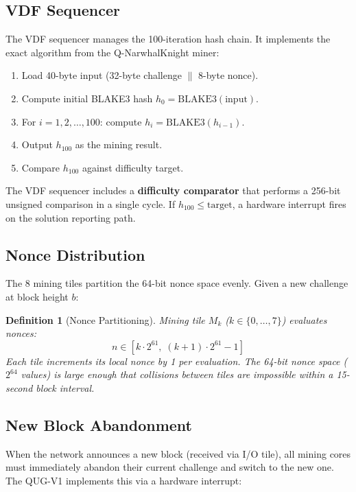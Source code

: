 \documentclass[11pt,a4paper]{article}
\newtheorem{definition}[theorem]{Definition}
\begin{document}
\subsection{VDF Sequencer}

The VDF sequencer manages the 100-iteration hash chain. It implements the exact algorithm from the Q-NarwhalKnight miner:

\begin{enumerate}
    \item Load 40-byte input (32-byte challenge $\|$ 8-byte nonce).
    \item Compute initial BLAKE3 hash $h_0 = \text{BLAKE3}(\text{input})$.
    \item For $i = 1, 2, \ldots, 100$: compute $h_i = \text{BLAKE3}(h_{i-1})$.
    \item Output $h_{100}$ as the mining result.
    \item Compare $h_{100}$ against difficulty target.
\end{enumerate}

The VDF sequencer includes a \textbf{difficulty comparator} that performs a 256-bit unsigned comparison in a single cycle. If $h_{100} \leq \text{target}$, a hardware interrupt fires on the solution reporting path.

\subsection{Nonce Distribution}

The 8 mining tiles partition the 64-bit nonce space evenly. Given a new challenge at block height $b$:

\begin{definition}[Nonce Partitioning]
Mining tile $M_k$ ($k \in \{0, \ldots, 7\}$) evaluates nonces:
\begin{equation}
    n \in \left[k \cdot 2^{61}, \; (k+1) \cdot 2^{61} - 1\right]
\end{equation}
Each tile increments its local nonce by 1 per evaluation. The 64-bit nonce space ($2^{64}$ values) is large enough that collisions between tiles are impossible within a 15-second block interval.
\end{definition}

\subsection{New Block Abandonment}

When the network announces a new block (received via I/O tile), all mining cores must immediately abandon their current challenge and switch to the new one. The QUG-V1 implements this via a hardware interrupt:
\end{document}
